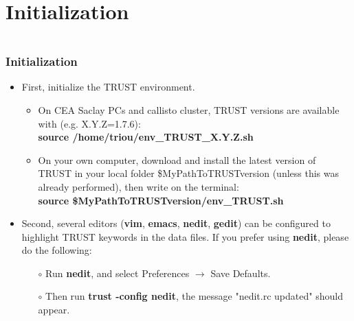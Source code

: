 \documentclass[10pt, hyperref={unicode=true,pdfusetitle, bookmarks=true,bookmarksnumbered=false,bookmarksopen=false, breaklinks=false,pdfborder={0 0 1},backref=true,colorlinks=true,linkcolor=darkblue,pageanchor}]{beamer}
\begin{document}
\section{{\bf{Initialization}}}
\begin{frame}
\begin{small}
\begin{columns}[c] 
\tableofcontents[sections={1-9},currentsection, currentsubsection]
\tableofcontents[sections={10-16},currentsection, currentsubsection]
\end{columns}
\end{small}
\end{frame}
\begin{frame}
\frametitle{Initialization}
\begin{block}{}

\begin{itemize}
\item First, initialize the TRUST environment. 
\begin{itemize}
\item On CEA Saclay PCs and callisto cluster, TRUST versions are available with (e.g. X.Y.Z=1.7.6):\\
\textbf{source  /home/triou/env\_TRUST\_X.Y.Z.sh}
\item On your own computer, download and install the latest version of TRUST in your local folder \$MyPathToTRUSTversion (unless this was already performed), then write on the terminal:\\
\textbf{source  \$MyPathToTRUSTversion/env\_TRUST.sh}
\end{itemize}

\item Second, several editors (\textbf{vim}, \textbf{emacs}, \textbf{nedit}, \textbf{gedit}) can be configured to highlight TRUST keywords in the data files. If you prefer using \textbf{nedit}, please do the following:

    \begin{itemize}
    \item [$\circ$] Run \textbf{nedit}, and select Preferences $\rightarrow$ Save Defaults.
    \item [$\circ$] Then run \textbf{trust -config nedit}, the message "nedit.rc updated" should appear.
    \end{itemize}
\end{itemize}

\end{block}
\end{frame}
\end{document}
